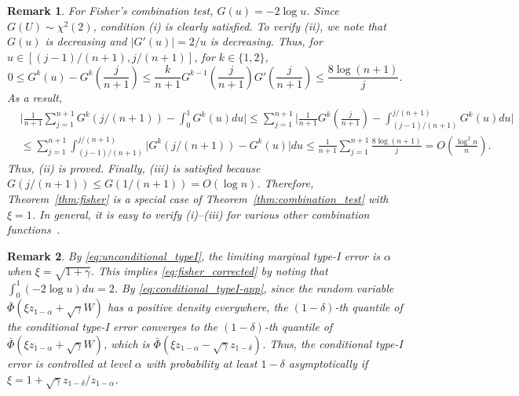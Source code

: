 \documentclass[11pt]{article}
\newtheorem{remark}{Remark}
\begin{document}
\begin{remark}
For Fisher's combination test, $G(u) = -2\log u$. Since $G(U)\sim \chi^2(2)$, condition (i) is clearly satisfied. To verify (ii), we note that $G(u)$ is decreasing and $|G'(u)| = 2 / u$ is decreasing. Thus, for $u\in [(j-1)/(n+1), j/(n+1)]$, for $k\in \{1, 2\}$,
\[0\le G^{k}(u) - G^{k}\left(\frac{j}{n+1}\right)\le \frac{k}{n+1}G^{k-1}\left(\frac{j}{n+1}\right)G'\left(\frac{j}{n+1}\right)\le \frac{8\log(n + 1)}{j}.\]
As a result,
\begin{align*}
&\bigg|\frac{1}{n+1}\sum_{j=1}^{n+1}G^k\left(j / (n + 1)\right) - \int_{0}^{1}G^{k}(u)du\bigg| \le \sum_{j=1}^{n+1}\bigg|\frac{1}{n+1}G^{k}\left(\frac{j}{n+1}\right) - \int_{(j-1)/(n+1)}^{j/(n+1)}G^{k}(u)du\bigg|\\
& \le \sum_{j=1}^{n+1}\int_{(j-1)/(n+1)}^{j/(n+1)}\big|G^k\left(j / (n + 1)\right) - G^{k}(u)\big|du \le \frac{1}{n+1}\sum_{j=1}^{n+1}\frac{8\log(n + 1)}{j} = O\left(\frac{\log^2 n}{n}\right).
\end{align*}
Thus, (ii) is proved. Finally, (iii) is satisfied because $G(j/(n+1))\le G(1/(n+1)) = O(\log n)$. Therefore, Theorem~\ref{thm:fisher} is a special case of Theorem~\ref{thm:combination_test} with $\xi = 1$. In general, it is easy to verify (i)--(iii) for various other combination functions~\cite{liptak1958combination, van1967combination, vovk2020combining}.
\end{remark}

\begin{remark}
By \eqref{eq:unconditional_typeI}, the limiting marginal type-I error is $\alpha$ when $\xi = \sqrt{1 + \gamma}$. This implies \eqref{eq:fisher_corrected} by noting that $\int_0^1 (-2\log u)du = 2$. By \eqref{eq:conditional_typeI-app}, since the random variable $\bar{\Phi}(\xi z_{1 - \alpha} + \sqrt{\gamma}W)$ has a positive density everywhere, the $(1 - \delta)$-th quantile of the conditional type-I error converges to the $(1 - \delta)$-th quantile of $\bar{\Phi}(\xi z_{1 - \alpha} + \sqrt{\gamma}W)$, which is $\bar{\Phi}(\xi z_{1 - \alpha} - \sqrt{\gamma}z_{1 - \delta})$. Thus, the conditional type-I error is controlled at level $\alpha$ with probability at least $1 - \delta$ asymptotically if $\xi = 1 + \sqrt{\gamma}z_{1 - \delta}/ z_{1 - \alpha}$. 
\end{remark}
\end{document}
